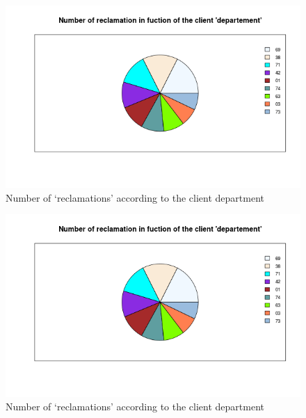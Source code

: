 \documentclass[a4paper, 11pt]{article}
\begin{document}
    \begin{figure}[!ht]
    	\centering
            \includegraphics[height = 10 cm]{Valentin/Number_of_reclamation_in_fuction_of_the_client_departement.png}
            \caption{Number of `reclamations' according to the client department}
            \label{fig:reclamtion_dep1}
    \end{figure}
    
    \begin{figure}[!ht]
    	\centering
            \includegraphics[height = 10 cm]{Valentin/Number_of_reclamation_in_fuction_of_the_client_departement.png}
            \caption{Number of `reclamations' according to the client department}
            \label{fig:reclamtion_dep2}
    \end{figure}
    
\end{document}
